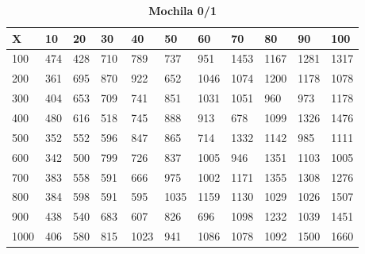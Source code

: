 \documentclass[10pt,letterpaper]{article}
\begin{document}
\newpage 
{}
\begin{center}
\begin{table}\renewcommand{\arraystretch}{2.5}
\caption{\large \textbf{Mochila 0/1}}
\centering
\begin{tabular} { |m{0.5cm}|m{1.3cm}|m{1.3cm}|m{1.3cm}|m{1.3cm}|m{1.3cm}|m{1.3cm}|m{1.3cm}|m{1.3cm}|m{1.3cm}|m{1.3cm}|} 
\hline
\rowcolor{Gray}
\centering \textbf{X} & \centering \textbf{10} & \centering \textbf{20} & \centering \textbf{30}\ & \centering \textbf{40} & \centering \textbf{50} & \centering \textbf{60}\ & \centering \textbf{70} & \centering \textbf{80} & \centering \textbf{90}\ & \textbf{100} \\\hline
\cellcolor{Gray}100 & \Large 474 & \Large 428 & \Large 710 & \Large 789 & \Large 737 & \Large 951 & \Large 1453 & \Large 1167 & \Large 1281 & \Large 1317 \\
\hline
\cellcolor{Gray}200 & \Large 361 & \Large 695 & \Large 870 & \Large 922 & \Large 652 & \Large 1046 & \Large 1074 & \Large 1200 & \Large 1178 & \Large 1078 \\
\hline
\cellcolor{Gray}300 & \Large 404 & \Large 653 & \Large 709 & \Large 741 & \Large 851 & \Large 1031 & \Large 1051 & \Large 960 & \Large 973 & \Large 1178 \\
\hline
\cellcolor{Gray}400 & \Large 480 & \Large 616 & \Large 518 & \Large 745 & \Large 888 & \Large 913 & \Large 678 & \Large 1099 & \Large 1326 & \Large 1476 \\
\hline
\cellcolor{Gray}500 & \Large 352 & \Large 552 & \Large 596 & \Large 847 & \Large 865 & \Large 714 & \Large 1332 & \Large 1142 & \Large 985 & \Large 1111 \\
\hline
\cellcolor{Gray}600 & \Large 342 & \Large 500 & \Large 799 & \Large 726 & \Large 837 & \Large 1005 & \Large 946 & \Large 1351 & \Large 1103 & \Large 1005 \\
\hline
\cellcolor{Gray}700 & \Large 383 & \Large 558 & \Large 591 & \Large 666 & \Large 975 & \Large 1002 & \Large 1171 & \Large 1355 & \Large 1308 & \Large 1276 \\
\hline
\cellcolor{Gray}800 & \Large 384 & \Large 598 & \Large 591 & \Large 595 & \Large 1035 & \Large 1159 & \Large 1130 & \Large 1029 & \Large 1026 & \Large 1507 \\
\hline
\cellcolor{Gray}900 & \Large 438 & \Large 540 & \Large 683 & \Large 607 & \Large 826 & \Large 696 & \Large 1098 & \Large 1232 & \Large 1039 & \Large 1451 \\
\hline
\cellcolor{Gray}1000 & \Large 406 & \Large 580 & \Large 815 & \Large 1023 & \Large 941 & \Large 1086 & \Large 1078 & \Large 1092 & \Large 1500 & \Large 1660 \\
\hline
\end{tabular} \\
\end{table}
\end{center}
\end{document}
